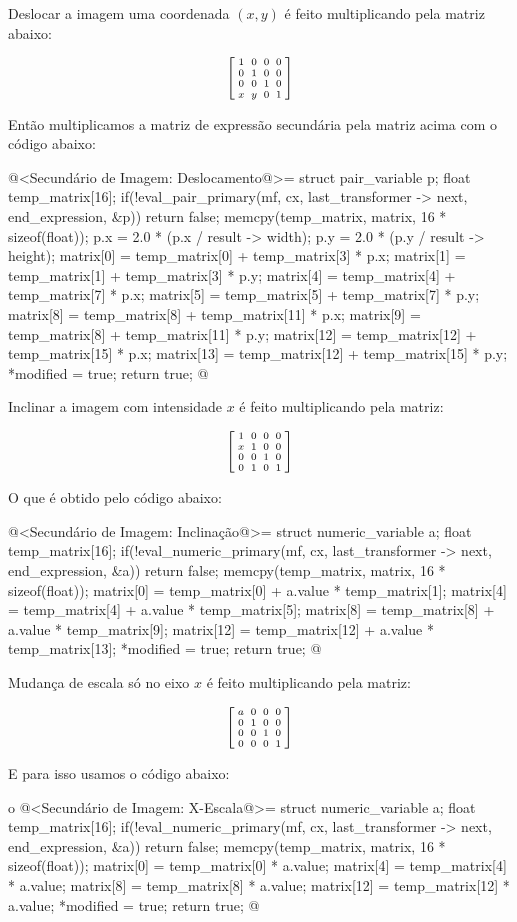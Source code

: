 {Deslocar a imagem uma coordenada $(x, y)$ é feito multiplicando pela
matriz abaixo:

$$\left[{{1 \atop 0}\atop {0\atop
   x}}{{0 \atop 1}\atop {0 \atop y}}{{0\atop 0}\atop{1 \atop
      0}}{{0 \atop 0}\atop{0\atop 1}}\right]
$$

Então multiplicamos a matriz de expressão secundária pela matriz acima
com o código abaixo:

\iniciocodigo
@<Secundário de Imagem: Deslocamento@>=
struct pair_variable p;
float temp_matrix[16];
if(!eval_pair_primary(mf, cx, last_transformer -> next, end_expression, &p))
  return false;
memcpy(temp_matrix, matrix, 16 * sizeof(float));
p.x = 2.0 * (p.x / result -> width);
p.y = 2.0 * (p.y / result -> height);
matrix[0] = temp_matrix[0] + temp_matrix[3] * p.x;
matrix[1] = temp_matrix[1] + temp_matrix[3] * p.y;
matrix[4] = temp_matrix[4] + temp_matrix[7] * p.x;
matrix[5] = temp_matrix[5] + temp_matrix[7] * p.y;
matrix[8] = temp_matrix[8] + temp_matrix[11] * p.x;
matrix[9] = temp_matrix[8] + temp_matrix[11] * p.y;
matrix[12] = temp_matrix[12] + temp_matrix[15] * p.x;
matrix[13] = temp_matrix[12] + temp_matrix[15] * p.y;
*modified = true;
return true;
@
\fimcodigo

Inclinar a imagem com intensidade $x$ é feito multiplicando pela
matriz:

$$\left[{{1 \atop x}\atop {0\atop
      0}}{{0 \atop 1}\atop {0 \atop 1}}{{0\atop 0}\atop{1 \atop
      0}}{{0 \atop 0}\atop{0\atop 1}}\right]
$$

O que é obtido pelo código abaixo:

\iniciocodigo
@<Secundário de Imagem: Inclinação@>=
struct numeric_variable a;
float temp_matrix[16];
if(!eval_numeric_primary(mf, cx, last_transformer -> next, end_expression, &a))
  return false;
memcpy(temp_matrix, matrix, 16 * sizeof(float));
matrix[0] = temp_matrix[0] + a.value * temp_matrix[1];
matrix[4] = temp_matrix[4] + a.value * temp_matrix[5];
matrix[8] = temp_matrix[8] + a.value * temp_matrix[9];
matrix[12] = temp_matrix[12] + a.value  * temp_matrix[13];
*modified = true;
return true;
@
\fimcodigo

Mudança de escala só no eixo $x$ é feito multiplicando pela matriz:

$$\left[{{a \atop 0}\atop {0\atop
      0}}{{0 \atop 1}\atop {0 \atop 0}}{{0\atop 0}\atop{1 \atop
      0}}{{0 \atop 0}\atop{0\atop 1}}\right]
$$

E para isso usamos o código abaixo:

o\iniciocodigo
@<Secundário de Imagem: X-Escala@>=
struct numeric_variable a;
float temp_matrix[16];
if(!eval_numeric_primary(mf, cx, last_transformer -> next, end_expression, &a))
  return false;
memcpy(temp_matrix, matrix, 16 * sizeof(float));
matrix[0] = temp_matrix[0] * a.value;
matrix[4] = temp_matrix[4] * a.value;
matrix[8] = temp_matrix[8] * a.value;
matrix[12] = temp_matrix[12] * a.value;
*modified = true;
return true;
@
\fimcodigo

}
